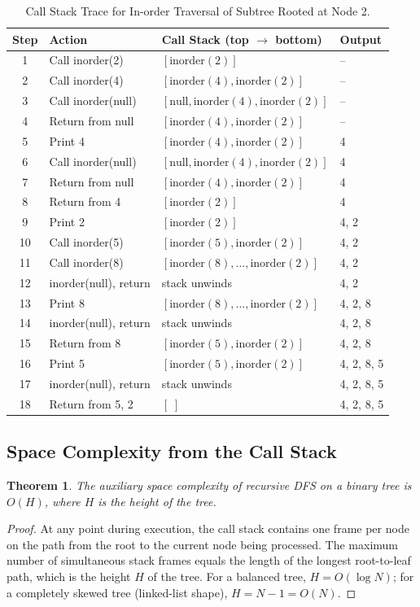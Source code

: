 \documentclass[10pt,journal,compsoc,onecolumn]{IEEEtran}
\newtheorem{theorem}{Theorem}
\begin{document}
\begin{table}[htbp]
\centering
\caption{Call Stack Trace for In-order Traversal of Subtree Rooted at Node 2.}
\label{tab:callstack_trace}
\begin{tabular}{clll}
\toprule
Step & Action & Call Stack (top $\to$ bottom) & Output \\
\midrule
1 & Call inorder(2) & $[\text{inorder}(2)]$ & -- \\
2 & Call inorder(4) & $[\text{inorder}(4), \text{inorder}(2)]$ & -- \\
3 & Call inorder(null) & $[\text{null}, \text{inorder}(4), \text{inorder}(2)]$ & -- \\
4 & Return from null & $[\text{inorder}(4), \text{inorder}(2)]$ & -- \\
5 & Print 4 & $[\text{inorder}(4), \text{inorder}(2)]$ & 4 \\
6 & Call inorder(null) & $[\text{null}, \text{inorder}(4), \text{inorder}(2)]$ & 4 \\
7 & Return from null & $[\text{inorder}(4), \text{inorder}(2)]$ & 4 \\
8 & Return from 4 & $[\text{inorder}(2)]$ & 4 \\
9 & Print 2 & $[\text{inorder}(2)]$ & 4, 2 \\
10 & Call inorder(5) & $[\text{inorder}(5), \text{inorder}(2)]$ & 4, 2 \\
11 & Call inorder(8) & $[\text{inorder}(8), ..., \text{inorder}(2)]$ & 4, 2 \\
12 & inorder(null), return & stack unwinds & 4, 2 \\
13 & Print 8 & $[\text{inorder}(8), ..., \text{inorder}(2)]$ & 4, 2, 8 \\
14 & inorder(null), return & stack unwinds & 4, 2, 8 \\
15 & Return from 8 & $[\text{inorder}(5), \text{inorder}(2)]$ & 4, 2, 8 \\
16 & Print 5 & $[\text{inorder}(5), \text{inorder}(2)]$ & 4, 2, 8, 5 \\
17 & inorder(null), return & stack unwinds & 4, 2, 8, 5 \\
18 & Return from 5, 2 & $[\;]$ & 4, 2, 8, 5 \\
\bottomrule
\end{tabular}
\end{table}

\subsection{Space Complexity from the Call Stack}
\begin{theorem}
The auxiliary space complexity of recursive DFS on a binary tree is $O(H)$, where $H$ is the height of the tree.
\end{theorem}
\begin{proof}
At any point during execution, the call stack contains one frame per node on the path from the root to the current node being processed. The maximum number of simultaneous stack frames equals the length of the longest root-to-leaf path, which is the height $H$ of the tree. For a balanced tree, $H = O(\log N)$; for a completely skewed tree (linked-list shape), $H = N - 1 = O(N)$.
\end{proof}
\end{document}
